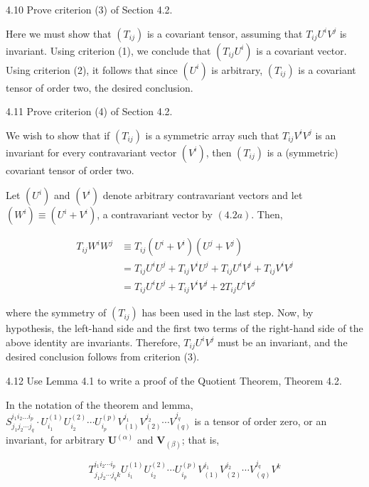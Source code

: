 \documentclass[10pt]{article}
\begin{document}
4.10 Prove criterion (3) of Section 4.2.

Here we must show that $\left(T_{i j}\right)$ is a covariant tensor, assuming that $T_{i j} U^{i} V^{j}$ is invariant. Using criterion (1), we conclude that $\left(T_{i j} U^{i}\right)$ is a covariant vector. Using criterion (2), it follows that since $\left(U^{i}\right)$ is arbitrary, $\left(T_{i j}\right)$ is a covariant tensor of order two, the desired conclusion.

4.11 Prove criterion (4) of Section 4.2.

We wish to show that if $\left(T_{i j}\right)$ is a symmetric array such that $T_{i j} V^{i} V^{j}$ is an invariant for every contravariant vector $\left(V^{i}\right)$, then $\left(T_{i j}\right)$ is a (symmetric) covariant tensor of order two.

Let $\left(U^{i}\right)$ and $\left(V^{i}\right)$ denote arbitrary contravariant vectors and let $\left(W^{i}\right) \equiv\left(U^{i}+V^{i}\right)$, a contravariant vector by $(4.2 a)$. Then,

$$
\begin{aligned}
T_{i j} W^{i} W^{j} & \equiv T_{i j}\left(U^{i}+V^{i}\right)\left(U^{j}+V^{j}\right) \\
& =T_{i j} U^{i} U^{j}+T_{i j} V^{i} U^{j}+T_{i j} U^{i} V^{j}+T_{i j} V^{i} V^{j} \\
& =T_{i j} U^{i} U^{j}+T_{i j} V^{i} V^{j}+2 T_{i j} U^{i} V^{j}
\end{aligned}
$$

where the symmetry of $\left(T_{i j}\right)$ has been used in the last step. Now, by hypothesis, the left-hand side and the first two terms of the right-hand side of the above identity are invariants. Therefore, $T_{i j} U^{i} V^{j}$ must be an invariant, and the desired conclusion follows from criterion (3).

4.12 Use Lemma 4.1 to write a proof of the Quotient Theorem, Theorem 4.2.

In the notation of the theorem and lemma, $S_{j_{1} j_{2} \cdots j_{q}}^{i_{1} i_{2} \ldots i_{p}} \cdot U_{i_{1}}^{(1)} U_{i_{2}}^{(2)} \cdots U_{i_{p}}^{(p)} V_{(1)}^{j_{1}} V_{(2)}^{j_{2}} \cdots V_{(q)}^{j_{q}}$ is a tensor of order zero, or an invariant, for arbitrary $\mathbf{U}^{(\alpha)}$ and $\mathbf{V}_{(\beta)}$; that is,

$$
T_{j_{1} j_{2} \cdots j_{q} k}^{i_{1} i_{2} \cdots i_{p}} U_{i_{1}}^{(1)} U_{i_{2}}^{(2)} \cdots U_{i_{p}}^{(p)} V_{(1)}^{j_{1}} V_{(2)}^{j_{2}} \cdots V_{(q)}^{j_{q}} V^{k}
$$
\end{document}
